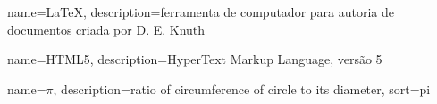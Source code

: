 
{
  name={LaTeX},
  description={ferramenta de computador para autoria de documentos criada por
               D. E. Knuth}
}

{
  name={HTML5},
  description={HyperText Markup Language, versão 5}
}

{
  name={\ensuremath{\pi}},
  description={ratio of circumference of circle to its
               diameter},
  sort=pi
}
